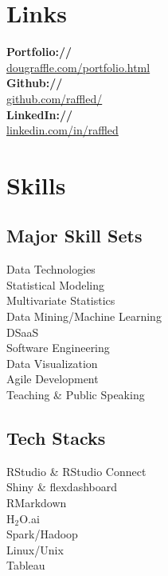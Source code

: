 \documentclass[letterpaper]{deedy-resume} %
\begin{document}
\begin{minipage}[t]{0.3\textwidth}
  \section{Links} 
  {\bf Portfolio://}\\ \href{http://www.dougraffle.com/portfolio.html}{dougraffle.com/portfolio.html}\\
  {\bf Github://}\\ \href{http://github.com/raffled/}{github.com/raffled/}\\
  {\bf LinkedIn://}\\ \href{https://www.linkedin.com/in/raffled}{linkedin.com/in/raffled} \\
  \sectionspace %
  \sectionspace

  \section{Skills}
  \subsection{Major Skill Sets}
  Data Technologies\\
  Statistical Modeling\\
  Multivariate Statistics\\
  Data Mining/Machine Learning\\
  DSaaS\\
  Software Engineering\\
  Data Visualization\\
  Agile Development\\
  Teaching \& Public Speaking\\

  \sectionspace %
  \vspace{3pt}

  \subsection{Tech Stacks}
  RStudio \& RStudio Connect\\
  Shiny \& flexdashboard\\
  RMarkdown\\
  H$_2$O.ai\\
  Spark/Hadoop\\
  Linux/Unix\\
  Tableau


\end{minipage}
\end{document}
